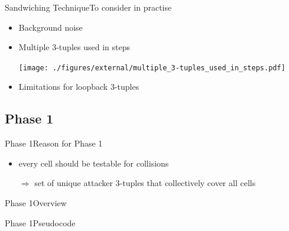\documentclass[aspectratio=169, hyperref={colorlinks=true, allcolors=SecondaryColor}, c]{beamer}
\begin{document}
	\begin{frame}[fragile, t]{Sandwiching Technique}{To consider in practise}
		\begin{itemize}
			\item \alert{Background noise}

			\item \alert{Multiple 3-tuples used in steps}

			\texttt{[image: ./figures/external/multiple\_3-tuples\_used\_in\_steps.pdf]} %
			\item \alert{Limitations for loopback 3-tuples}

		\end{itemize}
	\end{frame}
\else
\fi

\ifattackphaseone
	\subsection{Phase 1}

	\begin{frame}[fragile]{Phase 1}{Reason for Phase 1}
		\begin{adjustbox}{max width=\textwidth}
		\end{adjustbox}
		\begin{itemize}
			\item every cell should be testable for collisions
			\item[\alert{$\Rightarrow$}] set of \alert{unique attacker 3-tuples} that collectively cover all cells
		\end{itemize}
	\end{frame}

	\begin{frame}[fragile]{Phase 1}{Overview}
		\vspace{0.5cm}

		\begin{adjustbox}{max width=\textwidth}
		\end{adjustbox}
	\end{frame}

	\begin{frame}[fragile]{Phase 1}{Pseudocode}
		\begin{center}
			\begin{adjustbox}{scale=0.7}
				
			\end{adjustbox}
		\end{center}
	\end{frame}
\else
\fi
\end{document}
